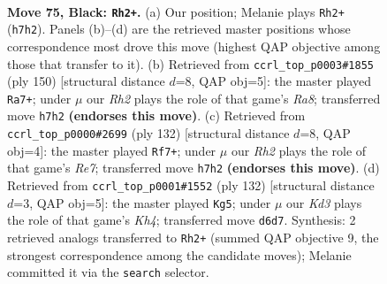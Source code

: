 \documentclass[11pt]{article}
\begin{document}
\clearpage

\begin{figure}[p]\centering
\begin{subfigure}{0.46\textwidth}\centering
\resizebox{\linewidth}{!}{%
\newchessgame
\chessboard[
  setfen={5R2/7r/3k4/3b4/1P6/8/2K5/4R3 b - - 24 75},
  showmover=false,
  pgfstyle=straightmove, color=movearrow, markmove={h7-h2}
]}
\caption{}
\end{subfigure}\hfill
\begin{subfigure}{0.46\textwidth}\centering
\resizebox{\linewidth}{!}{%
\newchessgame
\chessboard[
  setfen={R7/5kp1/2r5/4KB2/8/8/8/8 w - - 55 76},
  showmover=false,
  pgfstyle=straightmove, color=movearrow, markmove={a8-a7}
]}
\caption{}
\end{subfigure}
\\[4pt]
\begin{subfigure}{0.46\textwidth}\centering
\resizebox{\linewidth}{!}{%
\newchessgame
\chessboard[
  setfen={8/4R3/8/5k2/2BK1p2/r7/8/8 w - - 2 67},
  showmover=false,
  pgfstyle=straightmove, color=movearrow, markmove={e7-f7}
]}
\caption{}
\end{subfigure}\hfill
\begin{subfigure}{0.46\textwidth}\centering
\resizebox{\linewidth}{!}{%
\newchessgame
\chessboard[
  setfen={8/5R2/8/4k3/6BK/1r6/3r4/8 w - - 4 67},
  showmover=false,
  pgfstyle=straightmove, color=movearrow, markmove={h4-g5}
]}
\caption{}
\end{subfigure}
\caption{\textbf{Move 75, Black: \texttt{Rh2+}.} (a) Our position; Melanie plays \texttt{Rh2+} (\texttt{h7h2}). Panels (b)--(d) are the retrieved master positions whose correspondence most drove this move (highest QAP objective among those that transfer to it). (b) Retrieved from \texttt{ccrl\_top\_p0003\#1855} (ply 150) [structural distance $d$=8, QAP obj=5]: the master played \texttt{Ra7+}; under $\mu$ our \emph{Rh2} plays the role of that game's \emph{Ra8}; transferred move \texttt{h7h2} \textbf{(endorses this move)}. (c) Retrieved from \texttt{ccrl\_top\_p0000\#2699} (ply 132) [structural distance $d$=8, QAP obj=4]: the master played \texttt{Rf7+}; under $\mu$ our \emph{Rh2} plays the role of that game's \emph{Re7}; transferred move \texttt{h7h2} \textbf{(endorses this move)}. (d) Retrieved from \texttt{ccrl\_top\_p0001\#1552} (ply 132) [structural distance $d$=3, QAP obj=5]: the master played \texttt{Kg5}; under $\mu$ our \emph{Kd3} plays the role of that game's \emph{Kh4}; transferred move \texttt{d6d7}. Synthesis: 2 retrieved analogs transferred to \texttt{Rh2+} (summed QAP objective 9, the strongest correspondence among the candidate moves); Melanie committed it via the \texttt{search} selector.}
\label{fig:thought-m149}
\end{figure}
\end{document}
